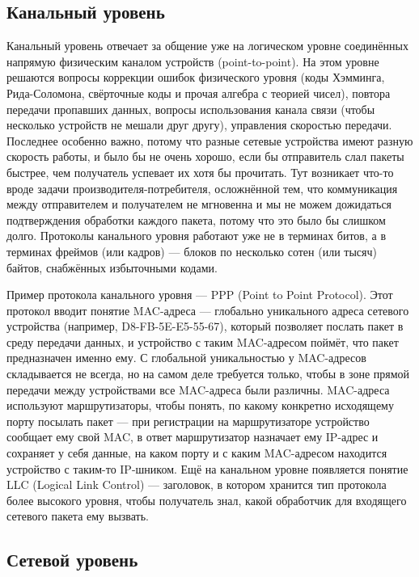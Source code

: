 \documentclass[a5paper]{article}
\begin{document}
\subsection{Канальный уровень}

Канальный уровень отвечает за общение уже на логическом уровне соединённых напрямую физическим каналом устройств (point-to-point). На этом уровне решаются вопросы коррекции ошибок физического уровня (коды Хэмминга, Рида-Соломона, свёрточные коды и прочая алгебра с теорией чисел), повтора передачи пропавших данных, вопросы использования канала связи (чтобы несколько устройств не мешали друг другу), управления скоростью передачи. Последнее особенно важно, потому что разные сетевые устройства имеют разную скорость работы, и было бы не очень хорошо, если бы отправитель слал пакеты быстрее, чем получатель успевает их хотя бы прочитать. Тут возникает что-то вроде задачи производителя-потребителя, осложнённой тем, что коммуникация между отправителем и получателем не мгновенна и мы не можем дожидаться подтверждения обработки каждого пакета, потому что это было бы слишком долго. Протоколы канального уровня работают уже не в терминах битов, а в терминах фреймов (или кадров) --- блоков по несколько сотен (или тысяч) байтов, снабжённых избыточными кодами.

Пример протокола канального уровня --- PPP (Point to Point Protocol). Этот протокол вводит понятие MAC-адреса --- глобально уникального адреса сетевого устройства (например, D8-FB-5E-E5-55-67), который позволяет послать пакет в среду передачи данных, и устройство с таким MAC-адресом поймёт, что пакет предназначен именно ему. С глобальной уникальностью у MAC-адресов складывается не всегда, но на самом деле требуется только, чтобы в зоне прямой передачи между устройствами все MAC-адреса были различны. MAC-адреса используют маршрутизаторы, чтобы понять, по какому конкретно исходящему порту посылать пакет --- при регистрации на маршрутизаторе устройство сообщает ему свой MAC, в ответ маршрутизатор назначает ему IP-адрес и сохраняет у себя данные, на каком порту и с каким MAC-адресом находится устройство с таким-то IP-шником. Ещё на канальном уровне появляется понятие LLC (Logical Link Control) --- заголовок, в котором хранится тип протокола более высокого уровня, чтобы получатель знал, какой обработчик для входящего сетевого пакета ему вызвать.

\subsection{Сетевой уровень}
\end{document}
